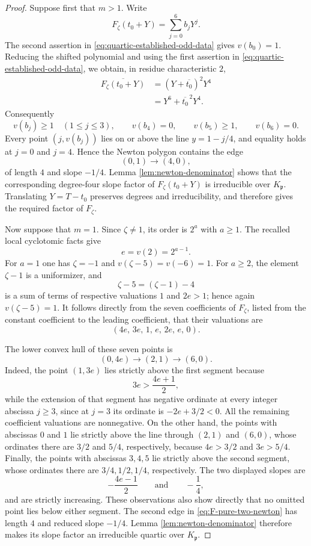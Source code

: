 \begin{proof}
Suppose first that $m>1$.  Write
\[
 F_\zeta(t_0+Y)=\sum_{j=0}^6 b_jY^j.
\]
The second assertion in \eqref{eq:quartic-established-odd-data} gives
$v(b_0)=1$.  Reducing the shifted polynomial and using the first
assertion in \eqref{eq:quartic-established-odd-data}, we obtain, in
residue characteristic $2$,
\begin{align*}
 \overline{F_\zeta(t_0+Y)}
 &=(Y+\overline{t_0})^2Y^4 \\
 &=Y^6+\overline{t_0}^{\,2}Y^4.
\end{align*}
Consequently
\[
 v(b_j)\geq1\quad(1\leq j\leq3),
 \qquad v(b_4)=0,
 \qquad v(b_5)\geq1,
 \qquad v(b_6)=0.
\]
Every point $(j,v(b_j))$ lies on or above the line
$y=1-j/4$, and equality holds at $j=0$ and $j=4$.  Hence the Newton
polygon contains the edge
\[
 (0,1)\longrightarrow(4,0),
\]
of length $4$ and slope $-1/4$.  Lemma
\ref{lem:newton-denominator} shows that the corresponding degree-four
slope factor of $F_\zeta(t_0+Y)$ is irreducible over
$K_{\mathfrak p}$.  Translating $Y=T-t_0$ preserves degrees and
irreducibility, and therefore gives the required factor of $F_\zeta$.

Now suppose that $m=1$.  Since $\zeta\ne1$, its order is $2^a$ with
$a\geq1$.  The recalled local cyclotomic facts give
\[
 e=v(2)=2^{a-1}.
\]
For $a=1$ one has $\zeta=-1$ and
$v(\zeta-5)=v(-6)=1$.  For $a\geq2$, the element $\zeta-1$ is a
uniformizer, and
\[
 \zeta-5=(\zeta-1)-4
\]
is a sum of terms of respective valuations $1$ and $2e>1$; hence again
$v(\zeta-5)=1$.  It follows directly from the seven coefficients of
$F_\zeta$, listed from the constant coefficient to the leading
coefficient, that their valuations are
\begin{equation}
 (4e,\,3e,\,1,\,e,\,2e,\,e,\,0).
 \label{eq:F-pure-two-valuations}
\end{equation}

The lower convex hull of these seven points is
\begin{equation}
 (0,4e)\longrightarrow(2,1)\longrightarrow(6,0).
 \label{eq:F-pure-two-newton}
\end{equation}
Indeed, the point $(1,3e)$ lies strictly above the first segment because
\[
 3e>\frac{4e+1}{2},
\]
while the extension of that segment has negative ordinate at every
integer abscissa $j\geq3$, since at $j=3$ its ordinate is
$-2e+3/2<0$.  All the remaining coefficient valuations are
nonnegative.  On the other hand, the points with abscissas $0$ and $1$
lie strictly above the line through $(2,1)$ and $(6,0)$, whose
ordinates there are $3/2$ and $5/4$, respectively, because
$4e>3/2$ and $3e>5/4$.  Finally, the points with abscissas $3,4,5$ lie
strictly above the second segment, whose ordinates there are
$3/4,1/2,1/4$, respectively.  The
two displayed slopes are
\[
 -\frac{4e-1}{2}
 \qquad\text{and}\qquad
 -\frac14,
\]
and are strictly increasing.  These observations also show directly
that no omitted point lies below either segment.  The second edge in
\eqref{eq:F-pure-two-newton} has length $4$ and reduced slope $-1/4$.
Lemma \ref{lem:newton-denominator} therefore makes its slope factor an
irreducible quartic over $K_{\mathfrak p}$.
\end{proof}

